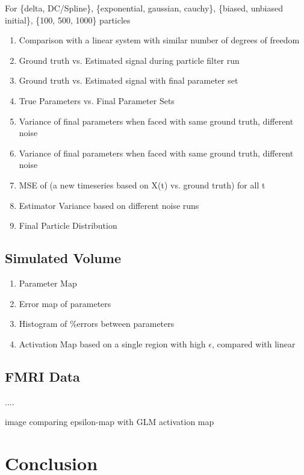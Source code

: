 \documentclass{article}
\begin{document}
For \{delta, DC/Spline\}, \{exponential, gaussian, cauchy\}, \{biased, unbiased initial\},
\{100, 500, 1000\} particles
\begin{enumerate}
\item Comparison with a linear system with similar number of degrees of freedom
\item Ground truth vs. Estimated signal during particle filter run
\item Ground truth vs. Estimated signal with final parameter set
\item True Parameters vs. Final Parameter Sets
\item Variance of final parameters when faced with same ground truth, different noise
\item Variance of final parameters when faced with same ground truth, different noise
\item MSE of (a new timeseries based on X(t) vs. ground truth) for all t
\item Estimator Variance based on different noise runs
\item Final Particle Distribution
\end{enumerate}

\subsection{Simulated Volume}
\begin{enumerate}
\item Parameter Map 
\item Error map of parameters
\item Histogram of \%errors between parameters
\item Activation Map based on a single region with high $\epsilon$, compared with linear
\end{enumerate}

\subsection{FMRI Data}
....

image comparing epsilon-map with GLM activation map

\section{Conclusion}


%
%

\end{document}
